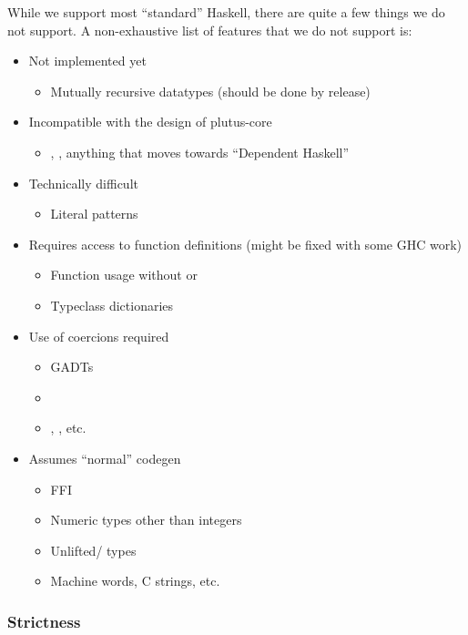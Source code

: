 While we support most ``standard'' Haskell, there are quite a few things we do not support. A non-exhaustive list of features that we do not support is:
\begin{itemize}
\item Not implemented yet
  \begin{itemize}
  \item Mutually recursive datatypes (should be done by release)
  \end{itemize}
\item Incompatible with the design of \gls{plutus-core}
  \begin{itemize}
    \item {}, , anything that moves towards ``Dependent Haskell''
  \end{itemize}
\item Technically difficult
  \begin{itemize}
  \item Literal patterns
  \end{itemize}
\item Requires access to function definitions (might be fixed with some GHC work)
  \begin{itemize}
  \item Function usage without  or 
  \item Typeclass dictionaries
  \end{itemize}
\item Use of coercions required
  \begin{itemize}
  \item GADTs
  \item {}
  \item {}, , etc.
  \end{itemize}
\item Assumes ``normal'' codegen
  \begin{itemize}
  \item FFI
  \item Numeric types other than integers
  \item Unlifted/ types
  \item Machine words, C strings, etc.
  \end{itemize}
\end{itemize}

\subsubsection{Strictness}
\label{sec:plutus-tx-strictness}

